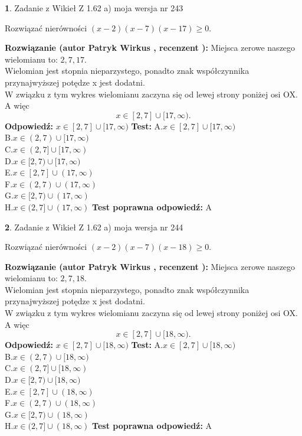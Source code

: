 \documentclass[12pt, a4paper]{article}
\theoremstyle{definition} %
\newtheorem{zad}{}
\newcommand{\zadStart}[1]{\begin{zad}#1\newline}
\newcommand{\zadStop}{\end{zad}}
\newcommand{\rozwStart}[2]{\noindent \textbf{Rozwiązanie (autor #1 , recenzent #2): }\newline}
\newcommand{\rozwStop}{\newline}
\newcommand{\odpStart}{\noindent \textbf{Odpowiedź:}\newline}
\newcommand{\odpStop}{\newline}
\newcommand{\testStart}{\noindent \textbf{Test:}\newline}
\newcommand{\testStop}{\newline}
\newcommand{\kluczStart}{\noindent \textbf{Test poprawna odpowiedź:}\newline}
\newcommand{\kluczStop}{\newline}
\begin{document}
\zadStart{Zadanie z Wikieł Z 1.62 a) moja wersja nr 243}

Rozwiązać nierówności $(x-2)(x-7)(x-17)\ge0$.
\zadStop
\rozwStart{Patryk Wirkus}{}
Miejsca zerowe naszego wielomianu to: $2, 7, 17$.\\
Wielomian jest stopnia nieparzystego, ponadto znak współczynnika przy\linebreak najwyższej potędze x jest dodatni.\\ W związku z tym wykres wielomianu zaczyna się od lewej strony poniżej osi OX. A więc $$x \in [2,7] \cup [17,\infty).$$
\rozwStop
\odpStart
$x \in [2,7] \cup [17,\infty)$
\odpStop
\testStart
A.$x \in [2,7] \cup [17,\infty)$\\
B.$x \in (2,7) \cup [17,\infty)$\\
C.$x \in (2,7] \cup [17,\infty)$\\
D.$x \in [2,7) \cup [17,\infty)$\\
E.$x \in [2,7] \cup (17,\infty)$\\
F.$x \in (2,7) \cup (17,\infty)$\\
G.$x \in [2,7) \cup (17,\infty)$\\
H.$x \in (2,7] \cup (17,\infty)$
\testStop
\kluczStart
A
\kluczStop



\zadStart{Zadanie z Wikieł Z 1.62 a) moja wersja nr 244}

Rozwiązać nierówności $(x-2)(x-7)(x-18)\ge0$.
\zadStop
\rozwStart{Patryk Wirkus}{}
Miejsca zerowe naszego wielomianu to: $2, 7, 18$.\\
Wielomian jest stopnia nieparzystego, ponadto znak współczynnika przy\linebreak najwyższej potędze x jest dodatni.\\ W związku z tym wykres wielomianu zaczyna się od lewej strony poniżej osi OX. A więc $$x \in [2,7] \cup [18,\infty).$$
\rozwStop
\odpStart
$x \in [2,7] \cup [18,\infty)$
\odpStop
\testStart
A.$x \in [2,7] \cup [18,\infty)$\\
B.$x \in (2,7) \cup [18,\infty)$\\
C.$x \in (2,7] \cup [18,\infty)$\\
D.$x \in [2,7) \cup [18,\infty)$\\
E.$x \in [2,7] \cup (18,\infty)$\\
F.$x \in (2,7) \cup (18,\infty)$\\
G.$x \in [2,7) \cup (18,\infty)$\\
H.$x \in (2,7] \cup (18,\infty)$
\testStop
\kluczStart
A
\kluczStop
\end{document}
